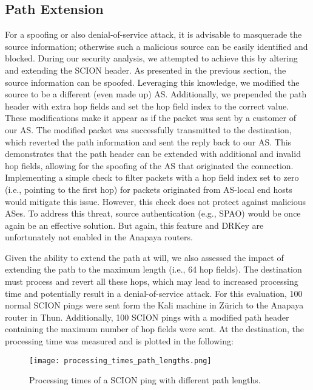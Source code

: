 \subsection{Path Extension}
For a spoofing or also denial-of-service attack, it is advisable to masquerade the source information; otherwise such a malicious source can be easily identified and blocked.
During our security analysis, we attempted to achieve this by altering and extending the SCION header.
As presented in the previous section, the source information can be spoofed.
Leveraging this knowledge, we modified the source to be a different (even made up) AS.
Additionally, we prepended the path header with extra hop fields and set the hop field index to the correct value.
These modifications make it appear as if the packet was sent by a customer of our AS.
The modified packet was successfully transmitted to the destination, which reverted the path information and sent the reply back to our AS.
This demonstrates that the path header can be extended with additional and invalid hop fields, allowing for the spoofing of the AS that originated the connection.
Implementing a simple check to filter packets with a hop field index set to zero (i.e., pointing to the first hop) for packets originated from AS-local end hosts would mitigate this issue.
However, this check does not protect against malicious ASes.
To address this threat, source authentication (e.g., SPAO) would be once again be an effective solution.
But again, this feature and DRKey are unfortunately not enabled in the Anapaya routers.

Given the ability to extend the path at will, we also assessed the impact of extending the path to the maximum length (i.e., 64 hop fields).
The destination must process and revert all these hops, which may lead to increased processing time and potentially result in a denial-of-service attack.
For this evaluation, 100 normal SCION pings were sent form the Kali machine in Zürich to the Anapaya router in Thun.
Additionally, 100 SCION pings with a modified path header containing the maximum number of hop fields were sent.
At the destination, the processing time was measured and is plotted in the following:

\begin{figure}[h]
    \centering
    \texttt{[image: processing\_times\_path\_lengths.png]}
    \caption{Processing times of a SCION ping with different path lengths.}
    \label{fig:path_extension}
\end{figure}

